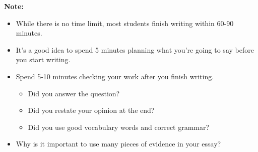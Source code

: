 \documentclass[12pt]{article}
\begin{document}
\vspace{1em}
\begin{tcolorbox}[colframe=black!40, colback=gray!5, 
coltitle=black, colbacktitle=black!20, fonttitle=\bfseries\Large, 
title=Additional Notes, halign title=center, left=5pt, right=5pt, top=5pt, bottom=15pt]
\textbf{Note:}
\begin{itemize}
    \item While there is no time limit, most students finish writing within 60-90 minutes. 
    \item It's a good idea to spend 5 minutes planning what you're going to say before you start writing.
    \item Spend 5-10 minutes checking your work after you finish writing. 
    \begin{itemize}
        \item Did you answer the question?
        \item Did you restate your opinion at the end?
        \item Did you use good vocabulary words and correct grammar?
    \end{itemize}



\end{itemize}
\end{tcolorbox}

\vspace{1em}

\begin{tcolorbox}[colframe=black!60, colback=white, 
coltitle=black, colbacktitle=black!15, fonttitle=\bfseries\Large, 
title=Exit Ticket, halign title=center, left=10pt, right=10pt, top=10pt, bottom=15pt]

\begin{itemize}
    \item Why is it important to use many pieces of evidence in your essay?

    \vspace{2em}
     \underline{\hspace{14.6cm}}  
    \\[0.8cm] \underline{\hspace{14.6cm}}  
    \\[0.8cm] \underline{\hspace{14.6cm}}


\end{itemize}
\end{tcolorbox}
\end{document}
